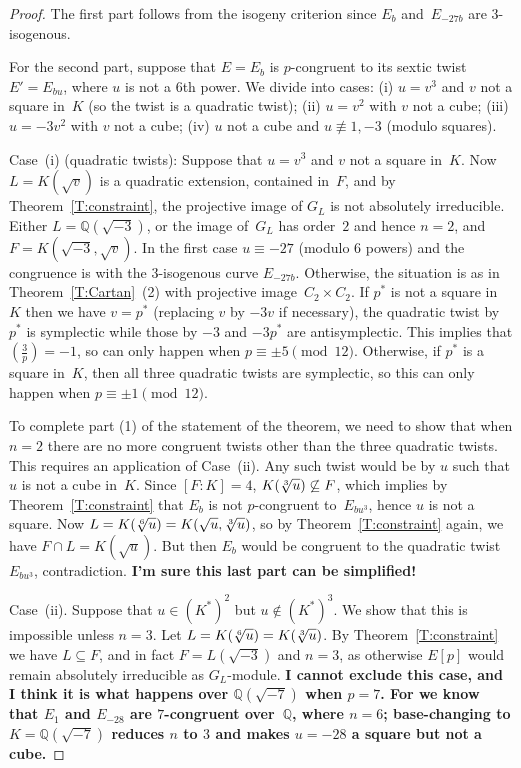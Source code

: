 \documentclass[12pt, reqno]{amsart}
\newcommand{\Q}{\mathbb{Q}}
\def\legendre#1#2{\left(\displaystyle\frac{#1}{#2}\right)}
\numberwithin{equation}{section}
\theoremstyle{definition}
\theoremstyle{remark}
\begin{document}
\begin{proof}
The first part follows from the isogeny criterion since $E_b$
and~$E_{-27b}$ are $3$-isogenous.

For the second part, suppose that $E=E_b$ is $p$-congruent to its
sextic twist $E'=E_{bu}$, where $u$ is not a $6$th power.  We divide
into cases: (i) $u=v^3$ and $v$ not a square in~$K$ (so the twist is a
quadratic twist); (ii) $u=v^2$ with $v$ not a cube; (iii) $u=-3v^2$
with $v$ not a cube; (iv) $u$ not a cube and $u\not\equiv1,-3$ (modulo
squares).

Case~(i) (quadratic twists): Suppose that $u=v^3$ and $v$ not a square
in~$K$.  Now $L=K(\sqrt{v})$ is a quadratic extension, contained
in~$F$, and by Theorem~\ref{T:constraint}, the projective image of
$G_L$ is not absolutely irreducible.  Either $L=\Q(\sqrt{-3})$, or the
image of~$G_L$ has order~$2$ and hence $n=2$, and $F=K(\sqrt{-3},
\sqrt{v})$.  In the first case $u\equiv-27$ (modulo $6$ powers) and
the congruence is with the $3$-isogenous curve $E_{-27b}$.  Otherwise,
the situation is as in Theorem~\ref{T:Cartan}~(2) with projective
image~$C_2\times C_2$.  If $p^*$ is not a square in~$K$ then we have
$v=p^*$ (replacing $v$ by $-3v$ if necessary), the quadratic twist
by~$p^*$ is symplectic while those by $-3$ and $-3p^*$ are
antisymplectic.  This implies that $\legendre{3}{p}=-1$, so can only
happen when $p\equiv\pm5\pmod{12}$.  Otherwise, if $p^*$ is a square
in~$K$, then all three quadratic twists are symplectic, so this can
only happen when $p\equiv\pm1\pmod{12}$.

To complete part (1) of the statement of the theorem, we need to show
that when $n=2$ there are no more congruent twists other than the
three quadratic twists.  This requires an application of Case~(ii).
Any such twist would be by $u$ such that $u$ is not a cube in~$K$.
Since $[F:K]=4$, $K(\root3\of{u})\not\subseteq F$, which implies by
Theorem~\ref{T:constraint} that $E_b$ is not $p$-congruent
to~$E_{bu^3}$, hence $u$ is not a square.  Now
$L=K(\root6\of{u})=K(\sqrt{u},\root3\of{u})$, so by
Theorem~\ref{T:constraint} again, we have $F\cap L = K(\sqrt{u})$.
But then $E_b$ would be congruent to the quadratic twist~$E_{bu^3}$,
contradiction. \textbf{I'm sure this last part can be simplified!}

Case~(ii).  Suppose that $u\in(K^*)^2$ but $u\not\in(K^*)^3$.  We show
that this is impossible unless $n=3$.  Let
$L=K(\root6\of{u})=K(\root3\of{u})$.  By Theorem~\ref{T:constraint} we
have $L\subseteq F$, and in fact $F=L(\sqrt{-3})$ and $n=3$, as
otherwise $E[p]$ would remain absolutely irreducible as $G_L$-module.
\textbf{I cannot exclude this case, and I think it is what happens
  over $\Q(\sqrt{-7})$ when $p=7$.  For we know that $E_1$ and
  $E_{-28}$ are $7$-congruent over~$\Q$, where $n=6$; base-changing to
  $K=\Q(\sqrt{-7})$ reduces $n$ to $3$ and makes $u=-28$ a square but
  not a cube.}


\end{proof}
\end{document}
